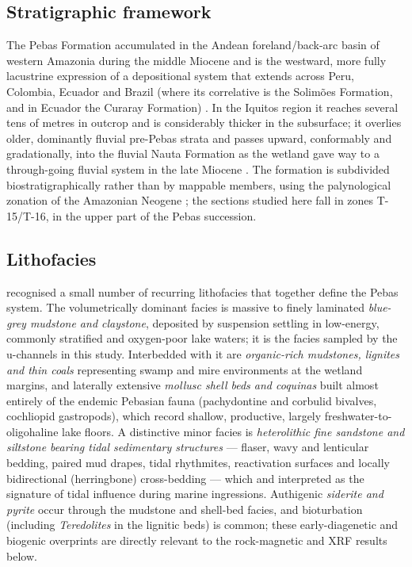 \documentclass[11pt]{article}
\begin{document}
\subsection{Stratigraphic framework}
The Pebas Formation accumulated in the Andean foreland/back-arc basin of western
Amazonia during the middle Miocene and is the westward, more fully lacustrine
expression of a depositional system that extends across Peru, Colombia, Ecuador
and Brazil (where its correlative is the Solim\~oes Formation, and in Ecuador the
Curaray Formation) \citep{Hoorn1993,Hoorn2010}. In the Iquitos region it reaches
several tens of metres in outcrop and is considerably thicker in the subsurface;
it overlies older, dominantly fluvial pre-Pebas strata and passes upward,
conformably and gradationally, into the fluvial Nauta Formation as the wetland
gave way to a through-going fluvial system in the late Miocene
\citep{Rebata2006}. The formation is subdivided biostratigraphically rather than
by mappable members, using the palynological zonation of the Amazonian Neogene
\citep{Jaramillo2011,Hoorn1993}; the sections studied here fall in zones
T-15/T-16, in the upper part of the Pebas succession.

\subsection{Lithofacies}
\citet{Hoorn1993,Hoorn1994} recognised a small number of recurring lithofacies
that together define the Pebas system. The volumetrically dominant facies is
massive to finely laminated \emph{blue-grey mudstone and claystone}, deposited by
suspension settling in low-energy, commonly stratified and oxygen-poor lake
waters; it is the facies sampled by the u-channels in this study. Interbedded
with it are \emph{organic-rich mudstones, lignites and thin coals} representing
swamp and mire environments at the wetland margins, and laterally extensive
\emph{mollusc shell beds and coquinas} built almost entirely of the endemic
Pebasian fauna (pachydontine and corbulid bivalves, cochliopid gastropods),
which record shallow, productive, largely freshwater-to-oligohaline lake floors.
A distinctive minor facies is \emph{heterolithic fine sandstone and siltstone
bearing tidal sedimentary structures} --- flaser, wavy and lenticular bedding,
paired mud drapes, tidal rhythmites, reactivation surfaces and locally
bidirectional (herringbone) cross-bedding --- which \citet{Hoorn1994} and
\citet{Rasanen1995} interpreted as the signature of tidal influence during
marine ingressions. Authigenic
\emph{siderite and pyrite} occur through the mudstone and shell-bed facies, and
bioturbation (including \textit{Teredolites} in the lignitic beds) is common;
these early-diagenetic and biogenic overprints are directly relevant to the
rock-magnetic and XRF results below.
\end{document}
